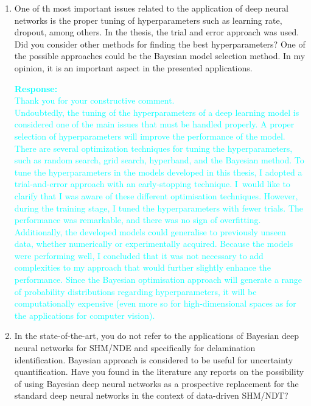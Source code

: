 \documentclass[11pt,a2paper]{report}
\begin{document}
{\begin{enumerate}
		\item One of th most important issues related to the application of deep neural networks is the proper tuning of hyperparameters such as learning rate, dropout, among others. 
		In the thesis, the trial and error approach was used. 
		Did you consider other methods for finding the best hyperparameters? One of the possible approaches could be the Bayesian model selection method. 
		In my opinion, it is an important aspect in the presented applications.
		
		\textcolor{Cyan}{
			\textbf{Response:}\\
			Thank you for your constructive comment. \\
			Undoubtedly, the tuning of the hyperparameters of a deep learning model is considered one of the main issues that must be handled properly.
			A proper selection of hyperparameters will improve the performance of the model. 
			There are several optimization techniques for tuning the hyperparameters, such as random search, grid search, hyperband, and the Bayesian method.
			To tune the hyperparameters in the models developed in this thesis, I adopted a trial-and-error approach with an early-stopping technique.
			I would like to clarify that I was aware of these different optimisation techniques.
			However, during the training stage, I tuned the hyperparameters with fewer trials. The performance was remarkable, and there was no sign of overfitting. 
			Additionally, the developed models could generalise to previously unseen data, whether numerically or experimentally acquired.
			Because the models were performing well, I concluded that it was not necessary to add complexities to my approach that would further slightly enhance the performance.
			Since the Bayesian optimisation approach will generate a range of probability distributions regarding hyperparameters, it will be computationally expensive (even more so for high-dimensional spaces as for the applications for computer vision). 
		}	
		
		\item In the state-of-the-art, you do not refer to the applications of Bayesian deep neural networks for SHM/NDE and specifically for delamination identification. 
		Bayesian approach is considered to be useful for uncertainty quantification. 
		Have you found in the literature any reports on the possibility of using Bayesian deep neural networks as a prospective replacement for the standard deep neural networks in the context of data-driven SHM/NDT?	
			

\end{enumerate}}
\end{document}
